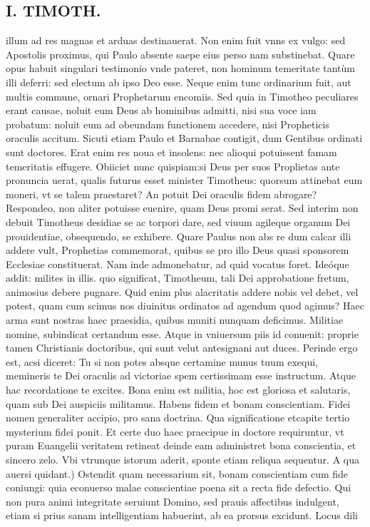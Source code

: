 \documentclass{article}
\begin{document}
\begin{pages}
\section*{I. TIMOTH. }
\marginpar{[ p.14 ]}\pstart illum ad res magnas et arduas destinauerat. Non enim fuit vnns ex vulgo: sed Apostolis proximus, qui Paulo absente saepe eius perso nam substinebat. Quare opus habuit singulari testimonio vnde pateret, non hominum temeritate tantùm illi deferri: sed electum ab ipso Deo esse. Neque enim tunc ordinarium fuit, aut multis commune, ornari Prophetarum encomiis. Sed quia in Timotheo peculiares erant causae, noluit eum Deus ab hominibus admitti, nisi sua voce iam probatum: noluit eum ad obeundam functionem accedere, nisi Propheticis oraculis accitum. Sicuti etiam Paulo et Barnabae contigit, dum Gentibus ordinati sunt doctores. Erat enim res noua et insolens: nec alioqui potuissent famam temeritatis effugere. Obiiciet nunc quispiam:si Deus per suos Proplietas ante pronuncia uerat, qualis futurus esset minister Timotheus: quorsum attinebat eum moneri, vt se talem praestaret? An potuit Dei oraculis fidem abrogare? Respondeo, non aliter potuisse euenire, quam Deus promi serat. Sed interim non debuit Timotheus desidiae se ac torpori dare, sed viuum agileque organum Dei prouidentiae, obsequendo, se exhibere. Quare Paulus non abs re dum calcar illi addere vult, Prophetias commemorat, quibus se pro illo Deus quasi sponsorem Ecclesiae constituerat. Nam inde admonebatur, ad quid vocatus foret. Ideóque addit: milites in illis. quo significat, Timotheum, tali Dei approbatione fretum, animosius debere pugnare. Quid enim plus alacritatis addere nobis vel debet, vel potest, quam cum scimus nos diuinitus ordinatos ad agendum quod agimus? Haec arma sunt nostras haec praesidia, quibus muniti nunquam deficimus. Militiae nomine, subindicat certandum esse. Atque in vniuersum piis id conuenit: proprie tamen Christianis doctoribus, qui sunt velut antesignani aut duces. Perinde ergo est, acsi diceret: Tu si non potes absque certamine munus tuum exequi, memineris te Dei oraculis ad victoriae spem certissimam esse instructum. Atque hac recordatione te excites. Bona enim est militia, hoc est gloriosa et salutaris, quam sub Dei auspiciis militamus.  \pend\pstart Habens fidem et bonam conscientiam. Fidei nomen generaliter accipio, pro sana doctrina. Qua significatione etcapite tertio mysterium fidei ponit. Et certe duo haec praecipue in doctore requiruntur, vt puram Euangelii veritatem retineat deinde eam administret bona conscientia, et sincero zelo. Vbi vtrunque istorum aderit, sponte etiam reliqua sequentur. A qua auersi quidant.) Ostendit quam necessarium sit, bonam conscientiam cum fide coniungi: quia econuerso malae conscientiae poena sit a recta fide defectio. Qui non pura animi integritate seruiunt Domino, sed prauis affectibus indulgent, etiam si prius sanam intelligentiam habuerint, ab ea prorsus excidunt. Locus dili\pend

\end{pages}
\end{document}
